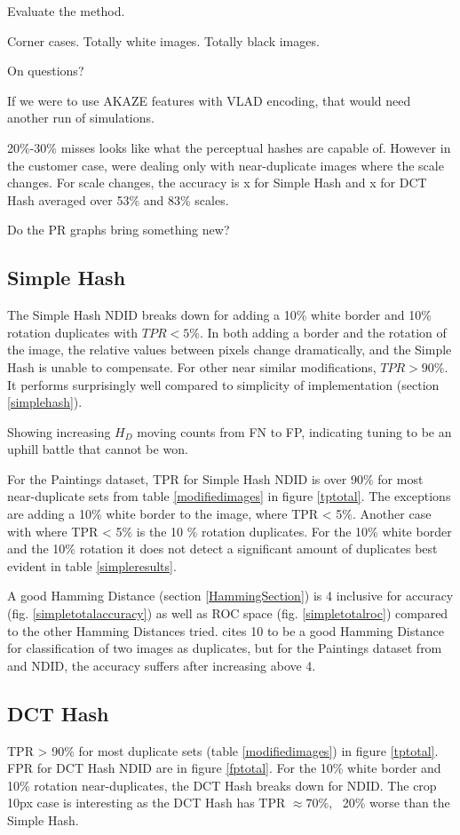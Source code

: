 \documentclass[english,12pt,a4paper,pdftex,elec,utf8, table]{aaltothesis}
\begin{document}
Evaluate the method.


Corner cases.
Totally white images. Totally black images.

On questions?

If we were to use AKAZE features with VLAD encoding, that would need another run of simulations.

20\%-30\% misses looks like what the perceptual hashes are capable of. However in the customer case, were dealing only with near-duplicate images where the scale changes. For scale changes, the accuracy is x for Simple Hash and x for DCT Hash averaged over 53\% and 83\% scales.

Do the PR graphs bring something new?

\subsection{Simple Hash}
The Simple Hash NDID breaks down for adding a 10\% white border and 10\% rotation duplicates with $TPR < 5\%$. In both adding a border and the rotation of the image, the relative values between pixels change dramatically, and the Simple Hash is unable to compensate. For other near similar modifications, $TPR > 90\%$. It performs surprisingly well compared to simplicity of implementation (section \ref{simplehash}).

Showing increasing $H_D$ moving counts from FN to FP, indicating tuning to be an uphill battle that cannot be won.

For the Paintings dataset, TPR for Simple Hash NDID is over 90\% for most near-duplicate sets from table \ref{modifiedimages} in figure \ref{tptotal}. The exceptions are adding a 10\% white border to the image, where TPR < 5\%. Another case with where TPR < 5\% is the 10 \% rotation duplicates. For the 10\% white border and the 10\% rotation it does not detect a significant amount of duplicates best evident in table \ref{simpleresults}.

A good Hamming Distance (section \ref{HammingSection}) is 4 inclusive for accuracy (fig. \ref{simpletotalaccuracy}) as well as ROC space (fig. \ref{simpletotalroc}) compared to the other Hamming Distances tried. \cite{Zauner2010} cites 10 to be a good Hamming Distance for classification of two images as duplicates, but for the Paintings dataset from \cite{Vedaldi2012} and NDID, the accuracy suffers after increasing above 4.



\subsection{DCT Hash}
TPR > 90\% for most duplicate sets (table \ref{modifiedimages}) in figure \ref{tptotal}. FPR for DCT Hash NDID are in figure \ref{fptotal}. For the 10\% white border and 10\% rotation near-duplicates, the DCT Hash breaks down for NDID. The crop 10px case is interesting as the DCT Hash has TPR $\approx 70\%$, ~20\% worse than the Simple Hash.
\end{document}

